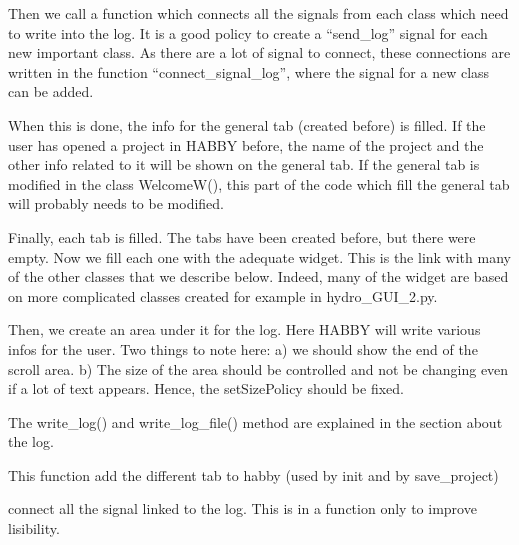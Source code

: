 \documentclass[letterpaper,10pt,english]{sphinxmanual}
\begin{document}
\begin{fulllineitems}
Then we call a function which connects all the signals from each class which need to write into the log. It is a good
policy to create a “send\_log” signal for each new important class. As there are a lot of signal to connect, these
connections are written in the function “connect\_signal\_log”, where the signal for a new class can be added.

When this is done, the info for the general tab (created before) is filled. If the user has opened a project in HABBY
before, the name of the project and the other info related to it will be shown on the general tab. If the general
tab is modified in the class WelcomeW(), this part of the code which fill the general tab will probably needs to
be modified.

Finally, each tab is filled. The tabs have been created before, but there were empty. Now we fill each one with the
adequate widget. This is the link with many of the other classes that we describe below. Indeed, many of the widget
are based on more complicated classes created for example in hydro\_GUI\_2.py.

Then, we create an area under it for the log. Here HABBY will write various infos for the user. Two things to note
here: a) we should show the end of the scroll area. b) The size of the area should be controlled and not be
changing even if a lot of text appears. Hence, the setSizePolicy should be fixed.

The write\_log() and write\_log\_file() method are explained in the section about the log.

\begin{fulllineitems}
\label{\detokenize{index:src_GUI.Main_windows_1.CentralW.add_all_tab}}
This function add the different tab to habby (used by init and by save\_project)

\end{fulllineitems}


\begin{fulllineitems}
\label{\detokenize{index:src_GUI.Main_windows_1.CentralW.connect_signal_log}}
connect all the signal linked to the log. This is in a function only to improve lisibility.

\end{fulllineitems}


\end{fulllineitems}
\end{document}
